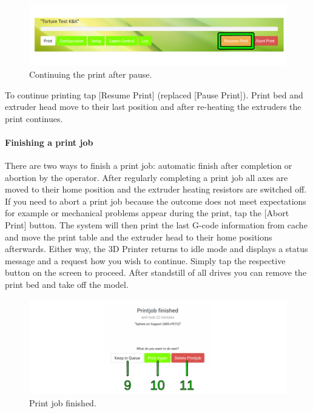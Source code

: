 \begin{figure}[H]
  \centering
  \includegraphics[width=.7\linewidth]{./img/om_resume_print.png}
  \caption{Continuing the print after pause.}
\end{figure}

To continue printing tap [Resume Print] (replaced [Pause Print]). Print bed and extruder head move to their last position and after re-heating the extruders the print continues. 

\paragraph{Finishing a print job}

There are two ways to finish a print job: automatic finish after completion or abortion by the operator.
After regularly completing a print job all axes are moved to their home position and the extruder heating resistors are switched off.
If you need to abort a print job because the outcome does not meet expectations for example or mechanical problems appear during the print, tap the [Abort Print] button. The system will then print the last G-code information from cache and move the print table and the extruder head to their home positions afterwards.
Either way, the 3D Printer returns to idle mode and displays a status message and a request how you wish to continue. Simply tap the respective button on the screen to proceed.
After standstill of all drives you can remove the print bed and take off the model. 

\begin{figure}[H]
  \centering
  \includegraphics[width=.7\linewidth]{./img/gui_finishedprinting_v110.png}
  \caption{Print job finished.}
\end{figure}

